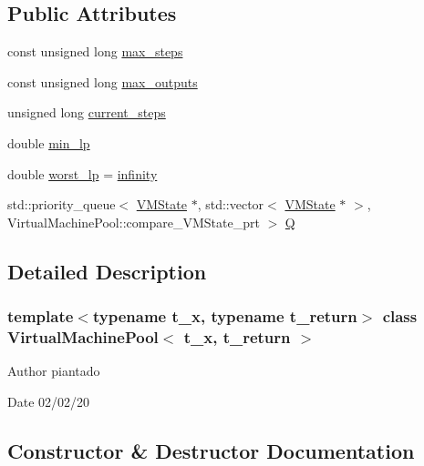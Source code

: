 \subsection*{Public Attributes}
\begin{DoxyCompactItemize}
\item 
const unsigned long \hyperlink{class_virtual_machine_pool_ae87303ebbcbff239ff4f3217087420a9}{max\+\_\+steps}
\item 
const unsigned long \hyperlink{class_virtual_machine_pool_ad32df5f3c78137c35a4fcc22916c8598}{max\+\_\+outputs}
\item 
unsigned long \hyperlink{class_virtual_machine_pool_a31cd55d7c9c7daf930bcc7f57b67d930}{current\+\_\+steps}
\item 
double \hyperlink{class_virtual_machine_pool_a3705ed3241bdd47aa2e585cfd67509d6}{min\+\_\+lp}
\item 
double \hyperlink{class_virtual_machine_pool_a9d5d6a1e078b9790f4193af8845d060f}{worst\+\_\+lp} = \hyperlink{_numerics_8h_a1bb1e42ae1b40cad6e99da0aab8a5576}{infinity}
\item 
std\+::priority\+\_\+queue$<$ \hyperlink{class_virtual_machine_state}{V\+M\+State} $\ast$, std\+::vector$<$ \hyperlink{class_virtual_machine_state}{V\+M\+State} $\ast$ $>$, Virtual\+Machine\+Pool\+::compare\+\_\+\+V\+M\+State\+\_\+prt $>$ \hyperlink{class_virtual_machine_pool_aab39827c242ded3fcc4675d2c24687a7}{Q}
\end{DoxyCompactItemize}


\subsection{Detailed Description}
\subsubsection*{template$<$typename t\+\_\+x, typename t\+\_\+return$>$\newline
class Virtual\+Machine\+Pool$<$ t\+\_\+x, t\+\_\+return $>$}

\begin{DoxyAuthor}{Author}
piantado 
\end{DoxyAuthor}
\begin{DoxyDate}{Date}
02/02/20 
\end{DoxyDate}


\subsection{Constructor \& Destructor Documentation}
\mbox{\label{class_virtual_machine_pool_abe43be5b1c5e9c1305b237a4a2bd209b}} 
